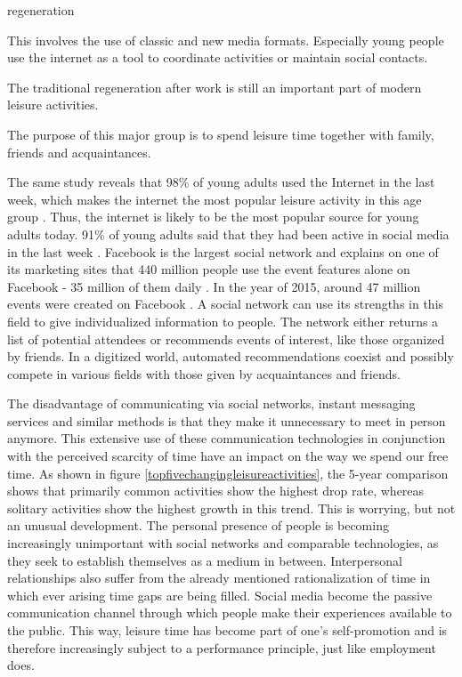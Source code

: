 \documentclass[12pt,numbers=noenddot,parskip,bibliography=totocnumbered,listof=totocnumbered,draft]{scrreprt}
\begin{document}
\begin{labeling}{regeneration}
\item[media use] This involves the use of classic and new media formats. Especially young people use the internet as a tool to coordinate activities or maintain social contacts.
\item[regeneration] The traditional regeneration after work is still an important part of modern leisure activities.
\item[socialize] The purpose of this major group is to spend leisure time together with family, friends and acquaintances.
\end{labeling}

The same study reveals that 98\% of young adults used the Internet in the last week, which makes the internet the most popular leisure activity in this age group \cite{freizeitmonitor2016}. Thus, the internet is likely to be the most popular source for young adults today. 91\% of young adults said that they had been active in social media in the last week \cite{freizeitmonitor2016}. Facebook is the largest social network and explains on one of its marketing sites that 440 million people use the event features alone on Facebook - 35 million of them daily \citep{facebook2017}. In the year of 2015, around 47 million events were created on Facebook \citep{facebook2017}. A social network can use its strengths in this field to give individualized information to people. The network either returns a list of potential attendees or recommends events of interest, like those organized by friends. In a digitized world, automated recommendations coexist and possibly compete in various fields with those given by acquaintances and friends.

The disadvantage of communicating via social networks, instant messaging services and similar methods is that they make it unnecessary to meet in person anymore. This extensive use of these communication technologies in conjunction with the perceived scarcity of time have an impact on the way we spend our free time. As shown in figure \ref{topfivechangingleisureactivities}, the 5-year comparison shows that primarily common activities show the highest drop rate, whereas solitary activities show the highest growth in this trend. This is worrying, but not an unusual development. The personal presence of people is becoming increasingly unimportant with social networks and comparable technologies, as they seek to establish themselves as a medium in between. Interpersonal relationships also suffer from the already mentioned rationalization of time in which ever arising time gaps are being filled. Social media become the passive communication channel through which people make their experiences available to the public. This way, leisure time has become part of one's self-promotion and is therefore increasingly subject to a performance principle, just like employment does.
\end{document}
